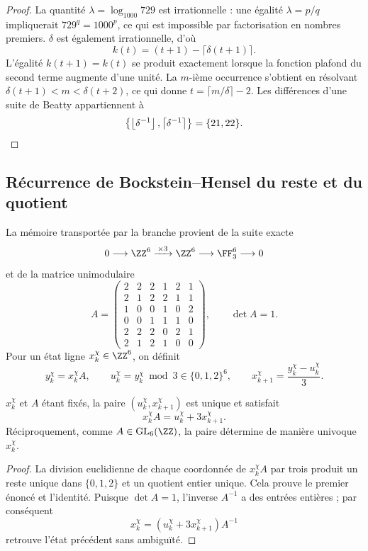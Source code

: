 \begin{proof}
La quantité \(\lambda=\log_{1000}729\) est irrationnelle : une égalité
\(\lambda=p/q\) impliquerait \(729^q=1000^p\), ce qui est impossible par factorisation
en nombres premiers. \(\delta\) est également irrationnelle, d'où
\[
k(t)=(t+1)-\lceil\delta(t+1)\rceil.
\]
L'égalité \(k(t+1)=k(t)\) se produit exactement lorsque la fonction plafond du
second terme augmente d'une unité. La \(m\)-ième occurrence s'obtient
en résolvant
\(\delta(t+1)<m<\delta(t+2)\), ce qui donne
\(t=\lceil m/\delta\rceil-2\). Les différences d'une suite de Beatty
appartiennent à
\[
\left\{\left\lfloor\delta^{-1}\right\rfloor,
\left\lceil\delta^{-1}\right\rceil\right\}=\{21,22\}.\qedhere
\]
\end{proof}

\subsection{Récurrence de Bockstein--Hensel du reste et du quotient}

La mémoire transportée par la branche provient de la suite exacte
\[
0\longrightarrow\ZZ^6\xrightarrow{\,\times3\,}\ZZ^6
\longrightarrow\FF_3^6\longrightarrow0
\]
et de la matrice unimodulaire
\[
A=
\begin{pmatrix}
2&2&2&1&2&1\\
2&1&2&2&1&1\\
1&0&0&1&0&2\\
0&0&1&1&1&0\\
2&2&2&0&2&1\\
2&1&2&1&0&0
\end{pmatrix},
\qquad\det A=1.
\]
Pour un état ligne \(x_k^\chi\in\ZZ^6\), on définit
\[
y_k^\chi=x_k^\chi A,
\qquad
u_k^\chi=y_k^\chi\bmod3\in\{0,1,2\}^6,
\qquad
x_{k+1}^\chi=\frac{y_k^\chi-u_k^\chi}{3}.
\]

\begin{proposition}
\label{prop:memoria-bockstein-hensel}
\(x_k^\chi\) et \(A\) étant fixés, la paire
\((u_k^\chi,x_{k+1}^\chi)\) est unique et satisfait
\[
x_k^\chi A=u_k^\chi+3x_{k+1}^\chi.
\]
Réciproquement, comme \(A\in\operatorname{GL}_6(\ZZ)\), la paire détermine
de manière univoque \(x_k^\chi\).
\end{proposition}

\begin{proof}
La division euclidienne de chaque coordonnée de \(x_k^\chi A\) par trois produit
un reste unique dans \(\{0,1,2\}\) et un quotient entier unique. Cela prouve
le premier énoncé et l'identité. Puisque \(\det A=1\), l'inverse
\(A^{-1}\) a des entrées entières ; par conséquent
\[
x_k^\chi=(u_k^\chi+3x_{k+1}^\chi)A^{-1}
\]
retrouve l'état précédent sans ambiguïté.
\end{proof}


